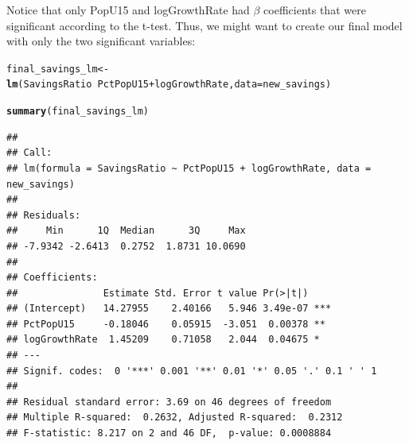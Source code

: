 \documentclass{article}\usepackage[]{graphicx}\usepackage[]{color}
\makeatletter
\newcommand{\hlopt}[1]{\textcolor[rgb]{0,0,0}{#1}}%
\newcommand{\hlstd}[1]{\textcolor[rgb]{0.345,0.345,0.345}{#1}}%
\newcommand{\hlkwb}[1]{\textcolor[rgb]{0.69,0.353,0.396}{#1}}%
\newcommand{\hlkwc}[1]{\textcolor[rgb]{0.333,0.667,0.333}{#1}}%
\newcommand{\hlkwd}[1]{\textcolor[rgb]{0.737,0.353,0.396}{\textbf{#1}}}%
\newenvironment{kframe}{%
 \def\at@end@of@kframe{}%
 \ifinner\ifhmode%
  \def\at@end@of@kframe{\end{minipage}}%
  \begin{minipage}{\columnwidth}%
 \fi\fi%
 \def\FrameCommand##1{\hskip\@totalleftmargin \hskip-\fboxsep
 \colorbox{shadecolor}{##1}\hskip-\fboxsep
     \hskip-\linewidth \hskip-\@totalleftmargin \hskip\columnwidth}%
 \MakeFramed {\advance\hsize-\width
   \@totalleftmargin\z@ \linewidth\hsize
   \@setminipage}}%
 {\par\unskip\endMakeFramed%
 \at@end@of@kframe}
\newenvironment{knitrout}{}{} %
\makeatother
\begin{document}
Notice that only PopU15 and logGrowthRate had $\beta$ coefficients that were significant according to the t-test. Thus, we might want to create our final model with only the two significant variables:

\begin{knitrout}
\color{fgcolor}\begin{kframe}
\begin{alltt}
\hlstd{final_savings_lm} \hlkwb{<-} \hlkwd{lm}\hlstd{(SavingsRatio} \hlopt{~} \hlstd{PctPopU15} \hlopt{+} \hlstd{logGrowthRate,} \hlkwc{data} \hlstd{= new_savings)}

\hlkwd{summary}\hlstd{(final_savings_lm)}
\end{alltt}
\begin{verbatim}
## 
## Call:
## lm(formula = SavingsRatio ~ PctPopU15 + logGrowthRate, data = new_savings)
## 
## Residuals:
##     Min      1Q  Median      3Q     Max 
## -7.9342 -2.6413  0.2752  1.8731 10.0690 
## 
## Coefficients:
##               Estimate Std. Error t value Pr(>|t|)    
## (Intercept)   14.27955    2.40166   5.946 3.49e-07 ***
## PctPopU15     -0.18046    0.05915  -3.051  0.00378 ** 
## logGrowthRate  1.45209    0.71058   2.044  0.04675 *  
## ---
## Signif. codes:  0 '***' 0.001 '**' 0.01 '*' 0.05 '.' 0.1 ' ' 1
## 
## Residual standard error: 3.69 on 46 degrees of freedom
## Multiple R-squared:  0.2632,	Adjusted R-squared:  0.2312 
## F-statistic: 8.217 on 2 and 46 DF,  p-value: 0.0008884
\end{verbatim}
\end{kframe}
\end{knitrout}
\end{document}
